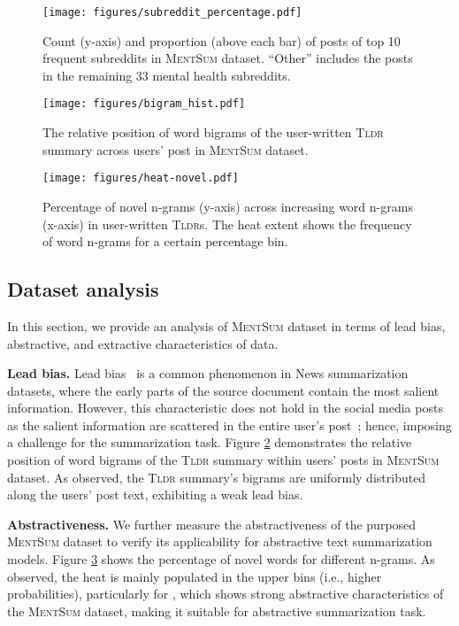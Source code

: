 \documentclass[10pt, a4paper]{article}
\newcommand{\tldr}{\textsc{Tldr}}
\newcommand{\mentsum}{\textsc{MentSum}}
\begin{document}
\begin{figure}
    \centering
    \texttt{[image: figures/subreddit\_percentage.pdf]}
    \caption{Count (y-axis) and proportion (above each bar) of posts of top 10 frequent subreddits  in \mentsum{} dataset. ``Other'' includes the posts in the remaining 33 mental health subreddits. }
    \label{fig:tldr_precentage}
\end{figure}

\begin{figure}
    \centering
    \texttt{[image: figures/bigram\_hist.pdf]}
    \caption{The relative position of word bigrams of the user-written \tldr{} summary across users' post in \mentsum{} dataset.  }
    \label{fig:lead}
\end{figure}

\begin{figure}[t]
    \centering
    \texttt{[image: figures/heat-novel.pdf]}
    \caption{Percentage of novel n-grams (y-axis) across increasing word n-grams (x-axis) in user-written \tldr s. The heat extent shows the frequency of word n-grams for a certain percentage bin.}
    \label{fig:novel}
\end{figure}


\subsection{Dataset analysis}
\label{sec:dataset_analysis}
In this section, we provide an analysis of \mentsum{} dataset in terms of lead bias, abstractive, and extractive characteristics of data.


\textbf{Lead bias. } Lead bias~\cite{Hong2014ImprovingTE} is a common phenomenon in News summarization datasets,
where the early parts of the source document contain the most salient information. However, this characteristic does not hold in the social media posts as the salient information are scattered in the entire user's post~\cite{Kim2019AbstractiveSO}; hence, imposing a challenge for the summarization task. Figure \ref{fig:lead} demonstrates the relative position of word bigrams of the \tldr{} summary within users' posts in \mentsum{} dataset. As observed, the \tldr{} summary's bigrams are uniformly distributed along the users' post text, exhibiting a weak lead bias. 

\textbf{Abstractiveness.} We further measure the abstractiveness of the purposed \mentsum{} dataset to verify its applicability for abstractive text summarization models. Figure \ref{fig:novel} shows the percentage of novel words for different n-grams. As observed, the heat is mainly populated in the upper bins (i.e., higher probabilities), particularly for , which shows strong abstractive characteristics of the \mentsum{} dataset, making it suitable for abstractive summarization task.  
\end{document}

